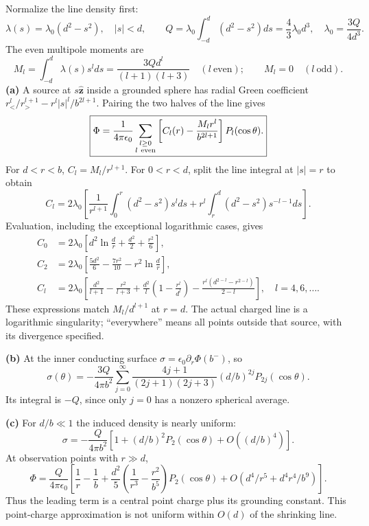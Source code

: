 Normalize the line density first:
\[
\lambda(s)=\lambda_0(d^2-s^2),\quad |s|<d,\qquad
Q=\lambda_0\int_{-d}^d(d^2-s^2)ds=\frac43\lambda_0d^3,
\quad\lambda_0=\frac{3Q}{4d^3}.
\]
The even multipole moments are
\[
M_l=\int_{-d}^d\lambda(s)s^l ds
=\frac{3Qd^l}{(l+1)(l+3)}\quad(l\ \mathrm{even});
\qquad M_l=0\quad(l\ \mathrm{odd}).
\]
\textbf{(a)} A source at $s\hat{\mathbf z}$ inside a grounded sphere
has radial Green coefficient
$r_<^l/r_>^{l+1}-r^l|s|^l/b^{2l+1}$.  Pairing the two halves of
the line gives
\[
\boxed{\Phi=\frac1{4\pi\epsilon_0}
\sum_{\substack{l\geq0\\l\ {\rm even}}}
\left[C_l(r)-\frac{M_lr^l}{b^{2l+1}}\right]P_l(\cos\theta).}
\]
For $d<r<b$, $C_l=M_l/r^{l+1}$.  For $0<r<d$, split the line
integral at $|s|=r$ to obtain
\[
C_l=2\lambda_0\left[
\frac1{r^{l+1}}\int_0^r(d^2-s^2)s^l ds
+r^l\int_r^d(d^2-s^2)s^{-l-1}ds\right].
\]
Evaluation, including the exceptional logarithmic cases, gives
\begin{align*}
C_0&=2\lambda_0\left[d^2\ln\frac dr+\frac{d^2}2+\frac{r^2}6\right],\\
C_2&=2\lambda_0\left[\frac{5d^2}6-\frac{7r^2}{10}
-r^2\ln\frac dr\right],\\
C_l&=2\lambda_0\left[\frac{d^2}{l+1}-\frac{r^2}{l+3}
+\frac{d^2}{l}\left(1-\frac{r^l}{d^l}\right)
-\frac{r^l(d^{2-l}-r^{2-l})}{2-l}\right],\quad l=4,6,\ldots.
\end{align*}
These expressions match $M_l/d^{l+1}$ at $r=d$.
The actual charged line is a logarithmic singularity; ``everywhere''
means all points outside that source, with its divergence specified.

\textbf{(b)} At the inner conducting surface
$\sigma=\epsilon_0\partial_r\Phi(b^-)$, so
\[
\boxed{\sigma(\theta)=-\frac{3Q}{4\pi b^2}
\sum_{j=0}^\infty\frac{4j+1}{(2j+1)(2j+3)}
(d/b)^{2j}P_{2j}(\cos\theta).}
\]
Its integral is $-Q$, since only $j=0$ has a nonzero spherical average.

\textbf{(c)} For $d/b\ll1$ the induced density is nearly uniform:
\[
\sigma=-\frac{Q}{4\pi b^2}
\left[1+(d/b)^2P_2(\cos\theta)+O((d/b)^4)\right].
\]
At observation points with $r\gg d$,
\[
\Phi=\frac{Q}{4\pi\epsilon_0}
\left[\frac1r-\frac1b+
\frac{d^2}{5}\left(\frac1{r^3}-\frac{r^2}{b^5}\right)P_2(\cos\theta)
+O\!\left(d^4/r^5+d^4r^4/b^9\right)\right].
\]
Thus the leading term is a central point charge plus its grounding
constant.  This point-charge approximation is not uniform within
$O(d)$ of the shrinking line.


